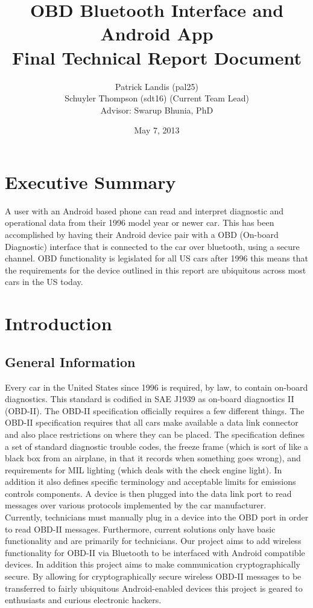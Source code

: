 \documentclass[12pt,letterpaper]{article}
\title{
\textbf{\LARGE OBD Bluetooth Interface and Android App} \\
\Large Final Technical Report Document
}
\author{
\normalsize Patrick Landis (pal25) \\
\normalsize Schuyler Thompson (sdt16) (Current Team Lead) \\
\normalsize Advisor: Swarup Bhunia, PhD
}
\date{\normalsize May 7, 2013}
\begin{document}
\maketitle

\section*{Executive Summary}
A user with an Android based phone can read and interpret diagnostic and operational data from their 1996 model year or newer car. This has been accomplished by having their Android device pair with a OBD (On-board Diagnostic) interface that is connected to the car over bluetooth, using a secure channel. OBD functionality is legislated for all US cars after 1996 this means that the requirements for the device outlined in this report are ubiquitous across most cars in the US today.

\newpage

\tableofcontents

\newpage

\section{Introduction}
\subsection{General Information}
Every car in the United States since 1996 is required, by law, to contain on-board diagnostics. This standard is codified in SAE J1939 as on-board diagnostics II (OBD-II). The OBD-II specification officially requires a few different things. The OBD-II specification requires that all cars make available a data link connector and also place restrictions on where they can be placed. The specification defines a set of standard diagnostic trouble codes, the freeze frame (which is sort of like a black box from an airplane, in that it records when something goes wrong), and requirements for MIL lighting (which deals with the check engine light). In addition it also defines specific terminology and acceptable limits for emissions controls components. A device is then plugged into the data link port to read messages over various protocols implemented by the car manufacturer. \\

Currently, technicians must manually plug in a device into the OBD port in order to read OBD-II messages. Furthermore, current solutions only have basic functionality and are primarily for technicians. Our project aims to add wireless functionality for OBD-II via Bluetooth to be interfaced with Android compatible devices. In addition this project aims to make communication cryptographically secure. By allowing for cryptographically secure wireless OBD-II messages to be transferred to fairly ubiquitous Android-enabled devices this project is geared to enthusiasts and curious electronic hackers. \\
\end{document}
